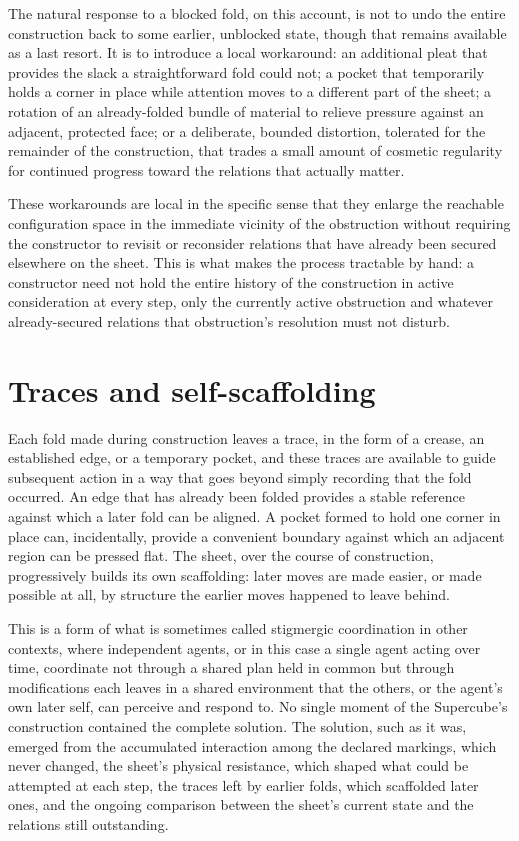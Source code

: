 \documentclass[11pt,oneside]{book}
\begin{document}
The natural response to a blocked fold, on this account, is not to undo
the entire construction back to some earlier, unblocked state, though
that remains available as a last resort. It is to introduce a local
workaround: an additional pleat that provides the slack a
straightforward fold could not; a pocket that temporarily holds a corner
in place while attention moves to a different part of the sheet; a
rotation of an already-folded bundle of material to relieve pressure
against an adjacent, protected face; or a deliberate, bounded
distortion, tolerated for the remainder of the construction, that trades
a small amount of cosmetic regularity for continued progress toward the
relations that actually matter.

These workarounds are local in the specific sense that they enlarge the
reachable configuration space in the immediate vicinity of the
obstruction without requiring the constructor to revisit or reconsider
relations that have already been secured elsewhere on the sheet. This is
what makes the process tractable by hand: a constructor need not hold
the entire history of the construction in active consideration at every
step, only the currently active obstruction and whatever already-secured
relations that obstruction's resolution must not disturb.

\hypertarget{traces-and-self-scaffolding}{%
\section{Traces and
self-scaffolding}\label{traces-and-self-scaffolding}}

Each fold made during construction leaves a trace, in the form of a
crease, an established edge, or a temporary pocket, and these traces are
available to guide subsequent action in a way that goes beyond simply
recording that the fold occurred. An edge that has already been folded
provides a stable reference against which a later fold can be aligned. A
pocket formed to hold one corner in place can, incidentally, provide a
convenient boundary against which an adjacent region can be pressed
flat. The sheet, over the course of construction, progressively builds
its own scaffolding: later moves are made easier, or made possible at
all, by structure the earlier moves happened to leave behind.

This is a form of what is sometimes called stigmergic coordination in
other contexts, where independent agents, or in this case a single agent
acting over time, coordinate not through a shared plan held in common
but through modifications each leaves in a shared environment that the
others, or the agent's own later self, can perceive and respond to. No
single moment of the Supercube's construction contained the complete
solution. The solution, such as it was, emerged from the accumulated
interaction among the declared markings, which never changed, the
sheet's physical resistance, which shaped what could be attempted at
each step, the traces left by earlier folds, which scaffolded later
ones, and the ongoing comparison between the sheet's current state and
the relations still outstanding.
\end{document}
